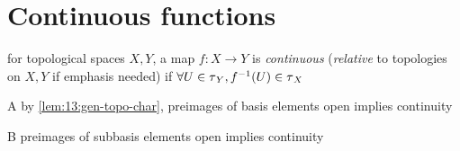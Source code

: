 \section{Continuous functions}

\begin{defn}
  for topological spaces $X, Y$, a map $f: X\rightarrow Y$
  is \emph{continuous} (\emph{relative} to topologies on $X, Y$
  if emphasis needed) if $\forall U\in\operatorname{\tau}_Y, f^{-1}(U)\in\operatorname{\tau}_X$
\end{defn}

\begin{rem}{A}
  by \ref{lem:13:gen-topo-char},
  preimages of basis elements open implies continuity
\end{rem}

\begin{rem}{B}
  preimages of subbasis elements open implies continuity
\end{rem}


